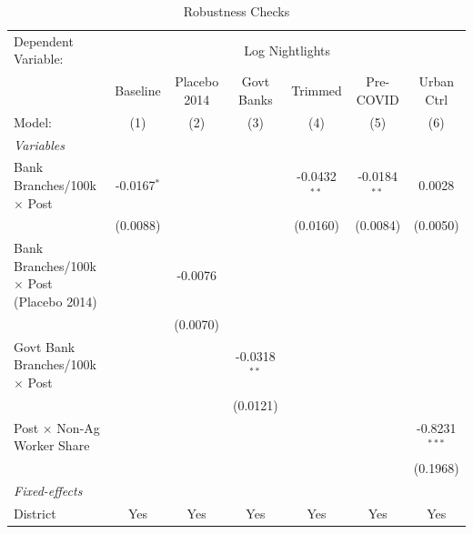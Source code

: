 
\begin{table}[htbp]
   \caption{\label{tab:robustness} Robustness Checks}
   \centering
   \small
   \begin{tabular}{lcccccc}
      \tabularnewline \midrule \midrule
      Dependent Variable: & \multicolumn{6}{c}{Log Nightlights}\\
                                                       & Baseline      & Placebo 2014 & Govt Banks     & Trimmed        & Pre-COVID      & Urban Ctrl \\   
      Model:                                           & (1)           & (2)          & (3)            & (4)            & (5)            & (6)\\  
      \midrule
      \emph{Variables}\\
      Bank Branches/100k $\times$ Post                 & -0.0167$^{*}$ &              &                & -0.0432$^{**}$ & -0.0184$^{**}$ & 0.0028\\   
                                                       & (0.0088)      &              &                & (0.0160)       & (0.0084)       & (0.0050)\\   
      Bank Branches/100k $\times$ Post (Placebo 2014)  &               & -0.0076      &                &                &                &   \\   
                                                       &               & (0.0070)     &                &                &                &   \\   
      Govt Bank Branches/100k $\times$ Post            &               &              & -0.0318$^{**}$ &                &                &   \\   
                                                       &               &              & (0.0121)       &                &                &   \\   
      Post $\times$ Non-Ag Worker Share                &               &              &                &                &                & -0.8231$^{***}$\\   
                                                       &               &              &                &                &                & (0.1968)\\   
      \midrule
      \emph{Fixed-effects}\\
      District                                         & Yes           & Yes          & Yes            & Yes            & Yes            & Yes\\  

\end{tabular}
\end{table}
